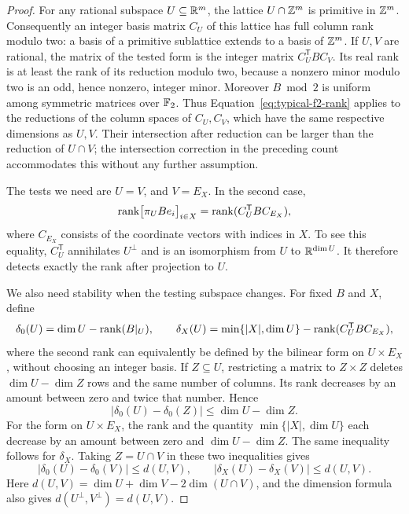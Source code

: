 \begin{proof}
For any rational subspace \(U\subseteq\mathbb R^m\), the lattice
\(U\cap\mathbb Z^m\) is primitive in \(\mathbb Z^m\). Consequently an integer
basis matrix \(C_U\) of this lattice has full column rank modulo two:
a basis of a primitive sublattice extends to a basis of \(\mathbb Z^m\).
If \(U,V\) are rational, the matrix of the tested form is the integer
matrix \(C_U^{\mathsf T}BC_V\). Its real rank is at least the rank of
its reduction modulo two, because a nonzero minor modulo two is an
odd, hence nonzero, integer minor. Moreover \(B\bmod 2\) is uniform
among symmetric matrices over \(\mathbb F_2\). Thus
Equation~\eqref{eq:typical-f2-rank} applies to the reductions of the
column spaces of \(C_U,C_V\), which have the same respective
dimensions as \(U,V\). Their intersection after reduction can be
larger than the reduction of \(U\cap V\); the intersection correction
in the preceding count accommodates this without any further
assumption.

The tests we need are \(U=V\), and \(V=E_X\). In the second case,
\[
 \operatorname{rank}\bigl[\pi_UBe_i\bigr]_{i\in X}
   =\operatorname{rank}(C_U^{\mathsf T}BC_{E_X}),
\]
where \(C_{E_X}\) consists of the coordinate vectors with indices in
\(X\). To see this equality, \(C_U^{\mathsf T}\) annihilates
\(U^\perp\) and is an isomorphism from \(U\) to \(\mathbb R^{\dim U}\).
It therefore detects exactly the rank after projection to \(U\).

We also need stability when the testing subspace changes. For fixed
\(B\) and \(X\), define
\[
 \delta_0(U)=\dim U-\operatorname{rank}(B|_U),\qquad
 \delta_X(U)=\min\{|X|,\dim U\}
      -\operatorname{rank}(C_U^{\mathsf T}BC_{E_X}),
\]
where the second rank can equivalently be defined by the bilinear
form on \(U\times E_X\), without choosing an integer basis. If
\(Z\subseteq U\), restricting a matrix to \(Z\times Z\) deletes
\(\dim U-\dim Z\) rows and the same number of columns. Its rank
decreases by an amount between zero and twice that number. Hence
\[
 |\delta_0(U)-\delta_0(Z)|\le\dim U-\dim Z.
\]
For the form on \(U\times E_X\), the rank and the quantity
\(\min\{|X|,\dim U\}\) each decrease by an amount between zero and
\(\dim U-\dim Z\). The same inequality follows for \(\delta_X\).
Taking \(Z=U\cap V\) in these two inequalities gives
\begin{equation}\label{eq:typical-rank-stability}
 |\delta_0(U)-\delta_0(V)|\le d(U,V),\qquad
 |\delta_X(U)-\delta_X(V)|\le d(U,V).
\end{equation}
Here \(d(U,V)=\dim U+\dim V-2\dim(U\cap V)\), and the dimension
formula also gives \(d(U^\perp,V^\perp)=d(U,V)\).


\end{proof}
